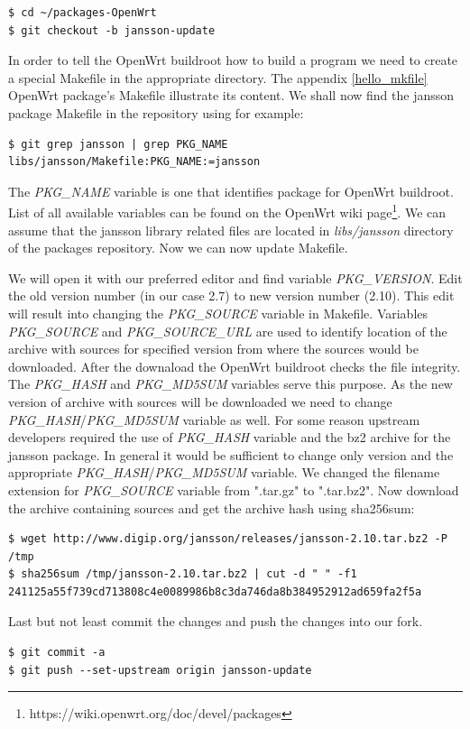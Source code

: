 \begin{lstlisting}[columns=fixed,basicstyle=\ttfamily\footnotesize,tabsize=4,backgroundcolor=\color{yellow!10}]
$ cd ~/packages-OpenWrt
$ git checkout -b jansson-update
\end{lstlisting}
In order to tell the OpenWrt buildroot how to build a program we need to create a special Makefile in the appropriate directory.
The appendix \ref{hello_mkfile} OpenWrt package's Makefile illustrate its content.
We shall now find the jansson package Makefile in the repository using for example:
\begin{lstlisting}[columns=fixed,basicstyle=\ttfamily\footnotesize,tabsize=4,backgroundcolor=\color{yellow!10}]
$ git grep jansson | grep PKG_NAME
libs/jansson/Makefile:PKG_NAME:=jansson
\end{lstlisting}
The {\it PKG\_NAME} variable is one that identifies package for OpenWrt buildroot\cite{creating_pkgs}.
List of all available variables can be found on the OpenWrt wiki page\footnote{https://wiki.openwrt.org/doc/devel/packages}.
We can assume that the jansson library related files are located in {\it libs/jansson} directory of the packages repository.
Now we can now update Makefile.

We will open it with our preferred editor and find variable {\it PKG\_VERSION}.
Edit the old version number (in our case 2.7) to new version number (2.10).
This edit will result into changing the {\it PKG\_SOURCE} variable in Makefile.
Variables {\it PKG\_SOURCE} and {\it PKG\_SOURCE\_URL} are used to identify location of the archive with sources for specified version from where the sources would be downloaded.
After the downaload the OpenWrt buildroot checks the file integrity.
The {\it PKG\_HASH} and {\it PKG\_MD5SUM} variables serve this purpose.
As the new version of archive with sources will be downloaded we need to change {\it PKG\_HASH}/{\it PKG\_MD5SUM} variable as well.
For some reason upstream developers required the use of {\it PKG\_HASH} variable and the bz2 archive for the jansson package.
In general it would be sufficient to change only version and the appropriate {\it PKG\_HASH}/{\it PKG\_MD5SUM} variable.
We changed the filename extension for {\it PKG\_SOURCE} variable from ".tar.gz" to ".tar.bz2".
Now download the archive containing sources and get the archive hash using sha256sum:
\begin{lstlisting}[columns=fixed,basicstyle=\ttfamily\footnotesize,tabsize=4,backgroundcolor=\color{yellow!10}]
$ wget http://www.digip.org/jansson/releases/jansson-2.10.tar.bz2 -P /tmp
$ sha256sum /tmp/jansson-2.10.tar.bz2 | cut -d " " -f1
241125a55f739cd713808c4e0089986b8c3da746da8b384952912ad659fa2f5a
\end{lstlisting}
Last but not least commit the changes and push the changes into our fork.
\begin{lstlisting}[columns=fixed,basicstyle=\ttfamily\footnotesize,tabsize=4,backgroundcolor=\color{yellow!10}]
$ git commit -a
$ git push --set-upstream origin jansson-update
\end{lstlisting}

